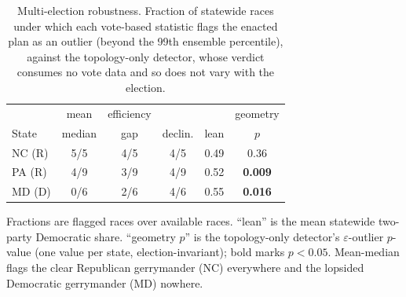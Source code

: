 \begin{table}[t]
\caption{Multi-election robustness. Fraction of statewide races under which
each vote-based statistic flags the enacted plan as an outlier (beyond the
99th ensemble percentile), against the topology-only detector, whose verdict
consumes no vote data and so does not vary with the election.}
\label{tab:elections}
\centering
\footnotesize
\begin{tabular}{lcccc c}
\toprule
 & mean & efficiency & & & geometry \\
State & median & gap & declin. & lean & $p$ \\
\midrule
NC (R) & 5/5 & 4/5 & 4/5 & 0.49 & 0.36 \\
PA (R) & 4/9 & 3/9 & 4/9 & 0.52 & \textbf{0.009} \\
MD (D) & 0/6 & 2/6 & 4/6 & 0.55 & \textbf{0.016} \\
\bottomrule
\end{tabular}

\vspace{2pt}
{\scriptsize Fractions are flagged races over available races. ``lean'' is the
mean statewide two-party Democratic share. ``geometry $p$'' is the topology-only
detector's $\varepsilon$-outlier $p$-value (one value per state, election-invariant);
bold marks $p<0.05$. Mean-median flags the clear Republican gerrymander (NC)
everywhere and the lopsided Democratic gerrymander (MD) nowhere.}
\end{table}
